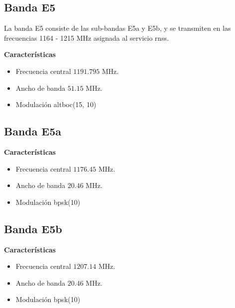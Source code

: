 
\subsection{Banda E5}

\begin{justify}
    La banda E5 consiste de las sub-bandas E5a y E5b, y  se transmiten en las frecuencias 1164 - 1215 MHz asignada al servicio
    \gls{rnss}.

    \textbf{Características}
    \begin{itemize}
        \item Frecuencia central $1191.795$ MHz.
        \item Ancho de banda $51.15$ MHz.
        \item Modulación \acrshort{altboc}(15, 10)
    \end{itemize}
\end{justify}

\subsection{Banda E5a}

\begin{justify}
    \textbf{Características}
    \begin{itemize}
        \item Frecuencia central $1176.45$ MHz.
        \item Ancho de banda $20.46$ MHz.
        \item Modulación \gls{bpsk}(10)
    \end{itemize}
\end{justify}

\subsection{Banda E5b}

\begin{justify}
    \textbf{Características}
    \begin{itemize}
        \item Frecuencia central $1207.14$ MHz.
        \item Ancho de banda $20.46$ MHz.
        \item Modulación \gls{bpsk}(10)
    \end{itemize}
\end{justify}

